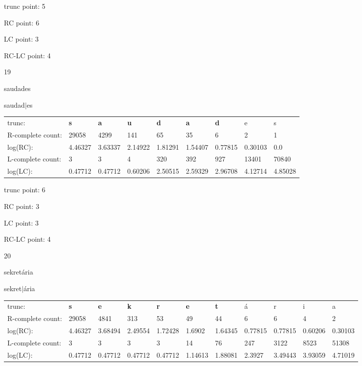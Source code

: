 \documentclass{article}
\begin{document}
trunc point: 5

RC point: 6

LC point: 3

RC-LC point: 4

\vspace{3em}



19

saudades

saudad$|$es

\vspace{1em}

\begin{tabular}{l|llllllll}

trunc: & {\color{red}\bf s} & {\color{red}\bf a} & {\color{red}\bf u} & {\color{red}\bf d} & {\color{red}\bf a} & {\color{red}\bf d} & e & s \\ 
R-complete count: & 29058 & 4299 & 141 & 65 & 35 & 6 & 2 & 1 \\ 
log(RC): & 4.46327 & 3.63337 & 2.14922 & 1.81291 & 1.54407 & 0.77815 & 0.30103 & 0.0 \\ 
L-complete count: & 3 & 3 & 4 & 320 & 392 & 927 & 13401 & 70840 \\ 
log(LC): & 0.47712 & 0.47712 & 0.60206 & 2.50515 & 2.59329 & 2.96708 & 4.12714 & 4.85028 \\ 
\end{tabular}

trunc point: 6

RC point: 3

LC point: 3

RC-LC point: 4

\vspace{3em}



20

sekretária

sekret$|$ária

\vspace{1em}

\begin{tabular}{l|llllllllll}

trunc: & {\color{red}\bf s} & {\color{red}\bf e} & {\color{red}\bf k} & {\color{red}\bf r} & {\color{red}\bf e} & {\color{red}\bf t} & á & r & i & a \\ 
R-complete count: & 29058 & 4841 & 313 & 53 & 49 & 44 & 6 & 6 & 4 & 2 \\ 
log(RC): & 4.46327 & 3.68494 & 2.49554 & 1.72428 & 1.6902 & 1.64345 & 0.77815 & 0.77815 & 0.60206 & 0.30103 \\ 
L-complete count: & 3 & 3 & 3 & 3 & 14 & 76 & 247 & 3122 & 8523 & 51308 \\ 
log(LC): & 0.47712 & 0.47712 & 0.47712 & 0.47712 & 1.14613 & 1.88081 & 2.3927 & 3.49443 & 3.93059 & 4.71019 \\ 
\end{tabular}
\end{document}
